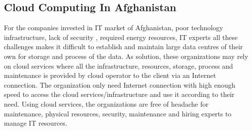 \subsection{Cloud Computing In Afghanistan}

For the companies invested in IT market of Afghanistan, poor technology infrastructure, lack of security , required energy resources, IT experts all these challenges makes it difficult to establish and  maintain large data centres of their own for storage and process of the data. As solution, these organizations may rely on cloud services where all the infrastructure, resources, storage, process and maintenance is provided by cloud operator to the client via an Internet connection. The organization only need Internet connection with high enough speed to access the cloud services/infrastructure and use it according to their need. Using cloud services, the organizations are free of headache for maintenance, physical resources, security, maintenance and hiring experts to manage IT resources.    



